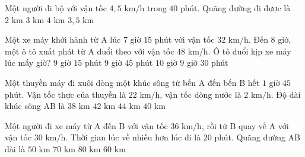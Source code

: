 \begin{ex} %
Một người đi bộ với vận tốc $4{,}5\text{ km/h}$ trong $40$ phút. Quãng đường đi được là
\choice
{$2\text{ km}$}
{\True $3\text{ km}$}
{$4\text{ km}$}
{$3{,}5\text{ km}$}
\end{ex}

\begin{ex} %
Một xe máy khởi hành từ A lúc $7$ giờ $15$ phút với vận tốc $32\text{ km/h}$. Đến $8$ giờ, một ô tô xuất phát từ A đuổi theo với vận tốc $48\text{ km/h}$. Ô tô đuổi kịp xe máy lúc mấy giờ?
\choice
{$9$ giờ $15$ phút}
{$9$ giờ $45$ phút}
{$10$ giờ}
{\True $9$ giờ $30$ phút}
\end{ex}

\begin{ex} %
Một thuyền máy đi xuôi dòng một khúc sông từ bến A đến bến B hết $1$ giờ $45$ phút. Vận tốc thực của thuyền là $22\text{ km/h}$, vận tốc dòng nước là $2\text{ km/h}$. Độ dài khúc sông AB là
\choice
{$38\text{ km}$}
{\True $42\text{ km}$}
{$44\text{ km}$}
{$40\text{ km}$}
\end{ex}

\begin{ex} %
Một người đi xe máy từ A đến B với vận tốc $36\text{ km/h}$, rồi từ B quay về A với vận tốc $30\text{ km/h}$. Thời gian lúc về nhiều hơn lúc đi là $20$ phút. Quãng đường AB dài là
\choice
{$50\text{ km}$}
{$70\text{ km}$}
{$80\text{ km}$}
{\True $60\text{ km}$}
\end{ex}

